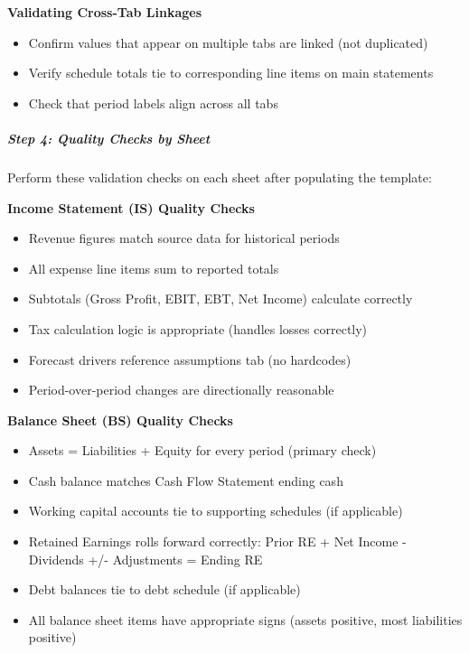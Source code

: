 \documentclass[11pt]{article}
\begin{document}
\textbf{Validating Cross-Tab Linkages}

\begin{itemize}[leftmargin=*,itemsep=2pt,topsep=2pt]
\item {} Confirm values that appear on multiple tabs are linked (not duplicated)
\item {} Verify schedule totals tie to corresponding line items on main statements
\item {} Check that period labels align across all tabs
\end{itemize}

\subparagraph{Step 4: Quality Checks by Sheet}\mbox{}\par

Perform these validation checks on each sheet after populating the template:


\textbf{Income Statement (IS) Quality Checks}

\begin{itemize}[leftmargin=*,itemsep=2pt,topsep=2pt]
\item {} Revenue figures match source data for historical periods
\item {} All expense line items sum to reported totals
\item {} Subtotals (Gross Profit, EBIT, EBT, Net Income) calculate correctly
\item {} Tax calculation logic is appropriate (handles losses correctly)
\item {} Forecast drivers reference assumptions tab (no hardcodes)
\item {} Period-over-period changes are directionally reasonable
\end{itemize}

\textbf{Balance Sheet (BS) Quality Checks}

\begin{itemize}[leftmargin=*,itemsep=2pt,topsep=2pt]
\item {} Assets = Liabilities + Equity for every period (primary check)
\item {} Cash balance matches Cash Flow Statement ending cash
\item {} Working capital accounts tie to supporting schedules (if applicable)
\item {} Retained Earnings rolls forward correctly: Prior RE + Net Income - Dividends +/- Adjustments = Ending RE
\item {} Debt balances tie to debt schedule (if applicable)
\item {} All balance sheet items have appropriate signs (assets positive, most liabilities positive)
\end{itemize}
\end{document}

